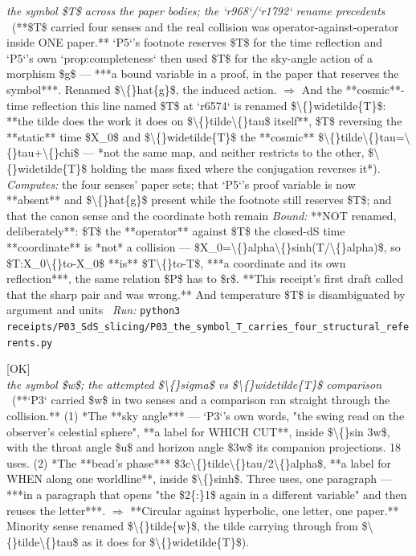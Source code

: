 \begin{description}
\textit{the symbol \$T\$ across the paper bodies; the `r968`/`r1792` rename precedents} \ (**\$T\$ carried four senses and the real collision was operator-against-operator inside ONE paper.** `P5`'s footnote reserves \$T\$ for the time reflection and `P5`'s own `prop:completeness` then used \$T\$ for the sky-angle action of a morphism \$g\$ --- ***a bound variable in a proof, in the paper that reserves the symbol***. Renamed \$\textbackslash\{\}hat\{g\}\$, the induced action. \ensuremath{\Rightarrow} And the **cosmic**-time reflection this line named \$T\$ at `r6574` is renamed \$\textbackslash\{\}widetilde\{T\}\$: **the tilde does the work it does on \$\textbackslash\{\}tilde\textbackslash\{\}tau\$ itself**, \$T\$ reversing the **static** time \$X\_0\$ and \$\textbackslash\{\}widetilde\{T\}\$ the **cosmic** \$\textbackslash\{\}tilde\textbackslash\{\}tau=\textbackslash\{\}tau+\textbackslash\{\}chi\$ --- *not the same map, and neither restricts to the other, \$\textbackslash\{\}widetilde\{T\}\$ holding the mass fixed where the conjugation reverses it*). 
\emph{Computes:} the four senses' paper sets; that `P5`'s proof variable is now **absent** and \$\textbackslash\{\}hat\{g\}\$ present while the footnote still reserves \$T\$; and that the canon sense and the coordinate both remain
 \emph{Bound:}  **NOT renamed, deliberately**: \$T\$ the **operator** against \$T\$ the closed-dS time **coordinate** is *not* a collision --- \$X\_0=\textbackslash\{\}alpha\textbackslash\{\}sinh(T/\textbackslash\{\}alpha)\$, so \$T:X\_0\textbackslash\{\}to-X\_0\$ **is** \$T\textbackslash\{\}to-T\$, ***a coordinate and its own reflection***, the same relation \$P\$ has to \$r\$. **This receipt's first draft called that the sharp pair and was wrong.** And temperature \$T\$ is disambiguated by argument and units
\ \emph{Run:} \texttt{python3 receipts/P03\_SdS\_slicing/P03\_the\_symbol\_T\_carries\_four\_structural\_referents.py}
\item[\rcptlabel{P03_the_symbol_w_carried_two_circles}{P3R66}\textbf{P3R66}\quad\texttt{P03\_the\_symbol\_w\_carried\_two\_circles}]\hfill\textsf{[OK]}\\
\textit{the symbol \$w\$; the attempted \$\textbackslash\{\}sigma\$ vs \$\textbackslash\{\}widetilde\{T\}\$ comparison} \ (**`P3` carried \$w\$ in two senses and a comparison ran straight through the collision.** (1) *The **sky angle*** --- `P3`'s own words, "the swing read on the observer's celestial sphere", **a label for WHICH CUT**, inside \$\textbackslash\{\}sin 3w\$, with the throat angle \$u\$ and horizon angle \$3w\$ its companion projections. 18 uses. (2) *The **bead's phase*** \$3c\textbackslash\{\}tilde\textbackslash\{\}tau/2\textbackslash\{\}alpha\$, **a label for WHEN along one worldline**, inside \$\textbackslash\{\}sinh\$. Three uses, one paragraph --- ***in a paragraph that opens "the \$2\{:\}1\$ again in a different variable" and then reuses the letter***. \ensuremath{\Rightarrow} **Circular against hyperbolic, one letter, one paper.** Minority sense renamed \$\textbackslash\{\}tilde\{w\}\$, the tilde carrying through from \$\textbackslash\{\}tilde\textbackslash\{\}tau\$ as it does for \$\textbackslash\{\}widetilde\{T\}\$). 

\end{description}
